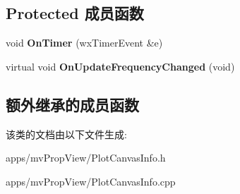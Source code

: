 \subsection*{Protected 成员函数}
\begin{DoxyCompactItemize}
\item 
\hypertarget{class_plot_canvas_feature_vs_time_a9c98a3e97e2b6eb229209696e410d2c5}{void {\bfseries On\+Timer} (wx\+Timer\+Event \&e)}\label{class_plot_canvas_feature_vs_time_a9c98a3e97e2b6eb229209696e410d2c5}

\item 
\hypertarget{class_plot_canvas_feature_vs_time_a0f0da2e6fd490ecb7daa781dbc4b0788}{virtual void {\bfseries On\+Update\+Frequency\+Changed} (void)}\label{class_plot_canvas_feature_vs_time_a0f0da2e6fd490ecb7daa781dbc4b0788}

\end{DoxyCompactItemize}
\subsection*{额外继承的成员函数}


该类的文档由以下文件生成\+:\begin{DoxyCompactItemize}
\item 
apps/mv\+Prop\+View/Plot\+Canvas\+Info.\+h\item 
apps/mv\+Prop\+View/Plot\+Canvas\+Info.\+cpp\end{DoxyCompactItemize}
